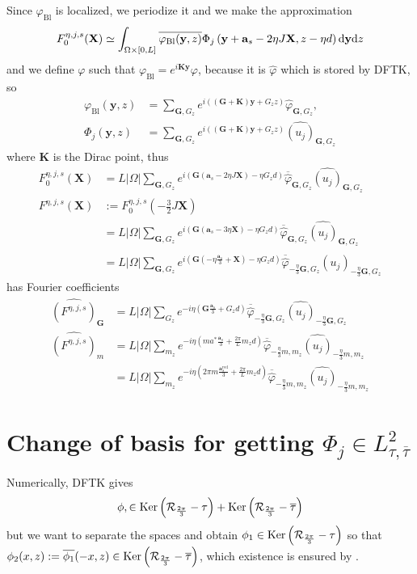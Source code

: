 \documentclass[11pt,a4paper,reqno,french,tikz]{amsart}
\def\d{{\rm d}}
\newcommand{\pa}[1]{\left( #1 \right)} %
\newcommand{\ab}[1]{\left|#1\right|} %
\newcommand\vp{\varphi} %
\let\p\relax\newcommand{\p}{\psi} %
\newcommand{\f}[2]{\frac{#1}{#2}} %
\def\bX{{\mathbf X}}
\def\bG{{\mathbf G}}
\def\ba{{\mathbf a}}
\def\by{{\mathbf y}}
\def\bK{{\mathbf K}}
\begin{document}
Since $\vp_{\text{Bl}}$ is localized, we periodize it and we make the approximation
\begin{align*}
F_0^{\eta,j,s}(\bX) \simeq \int_{\Omega \times [0,L]} \overline{\vp_{\text{Bl}}(\by,z)} \Phi_j\pa{\by +\ba_s -2\eta J \bX,z-\eta d} \d \by \d z
\end{align*}
and we define $\vp$ such that $\vp_{\text{Bl}} = e^{i \bK \by} \vp$, because it is $\widehat{\vp}$ which is stored by DFTK, so
\begin{align*}
\vp_{\text{Bl}}(\by,z)& = \sum_{\bG, G_z} e^{i\pa{(\bG + \bK)\by + G_z z}} \widehat{\vp}_{\bG,G_z}, \\
\Phi_j(\by,z) &= \sum_{\bG, G_z} e^{i\pa{(\bG + \bK)\by + G_z z}} \widehat{\pa{u_j}}_{\bG,G_z}
\end{align*}
where $\bK$ is the Dirac point, thus
\begin{align*}
F_0^{\eta,j,s}(\bX) &= L\ab{\Omega}  \sum_{\bG, G_z} e^{i\pa{\bG \pa{\ba_s - 2\eta J \bX} - \eta G_z d}} \overline{\widehat{\vp}}_{\bG,G_z} \widehat{\pa{u_j}}_{\bG,G_z} \\
F^{\eta,j,s}\pa{\bX} & := F_0^{\eta,j,s}\pa{-\tfrac{3}{2} J\bX} \\
		     &= L\ab{\Omega} \sum_{\bG, G_z} e^{i\pa{\bG \pa{\ba_s - 3\eta \bX} - \eta G_z d}} \overline{\widehat{\vp}}_{\bG,G_z}\widehat{\pa{u_j}}_{\bG,G_z}\\
&= L\ab{\Omega} \sum_{\bG, G_z} e^{i\pa{\bG \pa{-\eta \f{\ba_s}3 + \bX} - \eta G_z d}} \overline{\widehat{\vp}}_{-\f{\eta}{3}\bG,G_z} \widehat{\pa{u_j}}_{-\f{\eta}{3} \bG,G_z}
\end{align*}
has Fourier coefficients
\begin{align*}
	\widehat{\pa{F^{\eta,j,s}}}_{\bG} &= L\ab{\Omega} \sum_{G_z} e^{-i \eta \pa{\bG  \f{\ba_s}3 + G_z d}} \overline{\widehat{\vp}}_{-\f{\eta}{3}\bG,G_z} \widehat{\pa{u_j}}_{-\f{\eta}{3} \bG,G_z} \\
	\widehat{\pa{F^{\eta,j,s}}}_{m}& = L\ab{\Omega} \sum_{m_z} e^{-i \eta \pa{ma^*  \f{\ba_s}3 + \f{2\pi}{L} m_z d}} \overline{\widehat{\vp}}_{-\f{\eta}{3}m,m_z} \widehat{\pa{u_j}}_{-\f{\eta}{3} m,m_z} \\
& = L\ab{\Omega} \sum_{m_z} e^{-i \eta \pa{2\pi m \f{\ba^{\text{red}}_s}3 + \f{2\pi}{L} m_z d}} \overline{\widehat{\vp}}_{-\f{\eta}{3}m,m_z} \widehat{\pa{u_j}}_{-\f{\eta}{3} m,m_z}
\end{align*}




\section{Change of basis for getting $\Phi_j \in L^2_{\tau,\overline{\tau}}$}%
\label{sub:change_of_basis_for_getting_l_2__tau_tau}
Numerically, DFTK gives 
\begin{align*}
\phi, \p \in \Ker \pa{\cR_{\f{2\pi}{3}}-\tau} + \Ker\pa{\cR_{\f{2\pi}{3}}-\overline{\tau}}
\end{align*}
but we want to separate the spaces and obtain $\phi_1 \in \Ker \pa{\cR_{\f{2\pi}{3}}-\tau}$ so that $\phi_2(x,z) := \overline{\phi_1}(-x,z) \in \Ker\pa{\cR_{\f{2\pi}{3}}-\overline{\tau}}$, which existence is ensured by \cite{FefWei12}.
\end{document}
